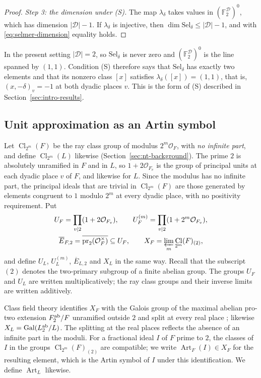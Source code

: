 \documentclass[11pt]{article}
\theoremstyle{plain}
\theoremstyle{definition}
\theoremstyle{remark}
\DeclareMathOperator{\Cl}{Cl}
\DeclareMathOperator{\Gal}{Gal}
\newcommand{\F}{\mathbb F}
\newcommand{\OO}{\mathcal O}
\begin{document}
\begin{proof}
\emph{Step 3: the dimension under \textup{(S)}.}  The map $\lambda_\delta$
takes values in $(\F_2^{\mathcal D})^0$, which has dimension
$|\mathcal D|-1$.  If $\lambda_\delta$ is injective, then
$\dim\mathrm{Sel}_\delta\le|\mathcal D|-1$, and with
\eqref{eq:selmer-dimension} equality holds.
\end{proof}

In the present setting $|\mathcal D|=2$, so $\mathrm{Sel}_\delta$ is never
zero and $(\F_2^{\mathcal D})^0$ is the line spanned by $(1,1)$.
Condition (S) therefore says that $\mathrm{Sel}_\delta$ has exactly two
elements and that its nonzero class $[x]$ satisfies
$\lambda_\delta([x])=(1,1)$, that is, $(x,-\delta)_v=-1$ at both dyadic
places $v$.  This is the form of (S) described in
Section~\ref{sec:intro-results}.

\subsection{Unit approximation as an Artin symbol}\label{sec:dyadic-ray}

Let $\Cl_{2^m}(F)$ be the ray class group of modulus $2^m\OO_F$, with
\emph{no infinite part}, and define $\Cl_{2^m}(L)$ likewise
(Section~\ref{sec:nt-background}).  The prime $2$ is absolutely
unramified in $F$ and in $L$, so $1+2\OO_{F_v}$ is the group of
principal units at each dyadic place $v$ of $F$, and likewise for $L$.
Since the modulus has no infinite part, the principal ideals that are
trivial in $\Cl_{2^m}(F)$ are those generated by elements congruent to
$1$ modulo $2^m$ at every dyadic place, with no positivity requirement.
Put
\[
\begin{gathered}
 U_F=\prod_{v\mid2}(1+2\OO_{F_v}),\qquad
 U_F^{(m)}=\prod_{v\mid2}(1+2^m\OO_{F_v}),\\
 \overline E_{F,2}=\overline{\operatorname{pr}_2(\OO_F^\times)}\subseteq U_F,\qquad
 X_F=\varprojlim_m \Cl_{2^m}(F)_{(2)},
\end{gathered}
\]
and define $U_L$, $U_L^{(m)}$, $\overline E_{L,2}$ and $X_L$ in the same
way.  Recall that the subscript $(2)$ denotes the two-primary subgroup of
a finite abelian group.  The groups $U_F$ and $U_L$ are written
multiplicatively; the ray class groups and their inverse limits are
written additively.

Class field theory identifies $X_F$ with the Galois group of the maximal
abelian pro-two extension $F^{\rm ab}_2/F$ unramified outside $2$ and split
at every real place \cite[Chapter~V, Theorems~3.5--3.6, Corollary~3.7 and
Example~3.9]{MilneCFT}; likewise $X_L=\Gal(L^{\rm ab}_2/L)$.  The
splitting at the real places reflects the absence of an infinite part in
the moduli.  For a fractional ideal $I$ of $F$ prime to $2$, the classes
of $I$ in the groups $\Cl_{2^m}(F)_{(2)}$ are compatible; we write
$\operatorname{Art}_F(I)\in X_F$ for the resulting element, which is the
Artin symbol of $I$ under this identification.  We define
$\operatorname{Art}_L$ likewise.
\end{document}
